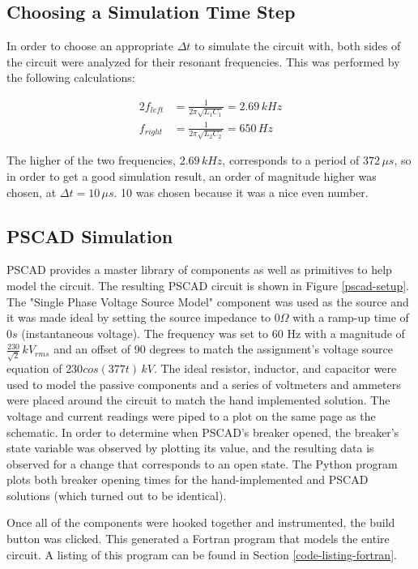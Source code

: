 \documentclass[10pt, oneside, letterpaper]{article}
\begin{document}
\subsection{Choosing a Simulation Time Step}

In order to choose an appropriate $\Delta{}t$ to simulate the circuit with, both sides of the circuit were analyzed for their resonant frequencies. This was performed by the following calculations:

\begin{alignat}{2}
f_{left} &= \frac{1}{2\pi\sqrt{L_1C_1}} = 2.69\,kHz \\
f_{right} &= \frac{1}{2\pi\sqrt{L_2C_2}} = 650\,Hz
\end{alignat}

The higher of the two frequencies, $2.69\,kHz$, corresponds to a period of $372\,\mu{}s$, so in order to get a good simulation result, an order of magnitude higher was chosen, at $\Delta{}t = 10\,\mu{}s$. 10 was chosen because it was a nice even number.

\subsection{PSCAD Simulation}

PSCAD provides a master library of components as well as primitives to help model the circuit. The resulting PSCAD circuit is shown in Figure \ref{pscad-setup}. The "Single Phase Voltage Source Model" component was used as the source and it was made ideal by setting the source impedance to $0 \Omega{}$ with a ramp-up time of $0 s$ (instantaneous voltage). The frequency was set to 60 Hz with a magnitude of $\frac{230}{\sqrt{2}}\,kV_{rms}$ and an offset of 90 degrees to match the assignment's voltage source equation of $230cos(377t)\,kV$. The ideal resistor, inductor, and capacitor were used to model the passive components and a series of voltmeters and ammeters were placed around the circuit to match the hand implemented solution. The voltage and current readings were piped to a plot on the same page as the schematic. In order to determine when PSCAD's breaker opened, the breaker's state variable was observed by plotting its value, and the resulting data is observed for a change that corresponds to an open state. The Python program plots both breaker opening times for the hand-implemented and PSCAD solutions (which turned out to be identical).

Once all of the components were hooked together and instrumented, the build button was clicked. This generated a Fortran program that models the entire circuit. A listing of this program can be found in Section \ref{code-listing-fortran}.
\end{document}
